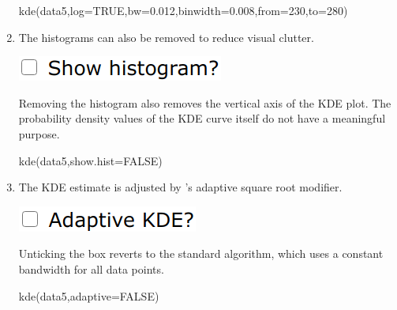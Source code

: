 \begin{refsection}
\begin{enumerate}
\begin{console}
kde(data5,log=TRUE,bw=0.012,binwidth=0.008,from=230,to=280)
\end{console}

\item The histograms can also be removed to reduce visual clutter.

\noindent\begin{minipage}[t]{.2\linewidth}
\strut\vspace*{-\baselineskip}\newline
\includegraphics[width=\linewidth]{../figures/UPbKDEhistogram.png}
\end{minipage}
\begin{minipage}[t]{.8\linewidth}
  Removing the histogram also removes the vertical axis of the KDE
  plot.  The probability density values of the KDE curve itself do not
  have a meaningful purpose.
\end{minipage}

\begin{console}
kde(data5,show.hist=FALSE)
\end{console}

\item The KDE estimate is adjusted by \citet{abramson1982}'s adaptive
  square root modifier.

\noindent\begin{minipage}[t]{.19\linewidth}
\strut\vspace*{-\baselineskip}\newline
\includegraphics[width=\linewidth]{../figures/UPbKDEadaptive.png}
\end{minipage}
\begin{minipage}[t]{.81\linewidth}
  Unticking the box reverts to the standard \citet{botev2010}
  algorithm, which uses a constant bandwidth for all data points.
\end{minipage}

\begin{console}
kde(data5,adaptive=FALSE)
\end{console}


\end{enumerate}
\end{refsection}
